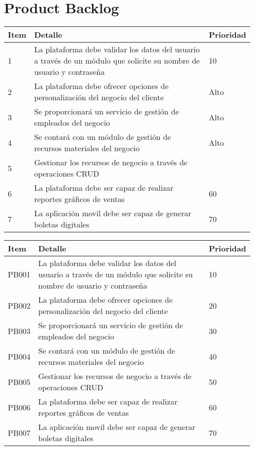 \chapter{Product Backlog}

\begin{table}[htbp]
	\begin{center}
		\begin{tabular}{|p{0.8cm} | p{12cm} | p{2cm} |}
			\hline
			Item & Detalle & Prioridad \\
			\hline
			1 & La plataforma debe validar los datos del usuario a través de un módulo que solicite su nombre de usuario y contraseña & 10 \\
			\hline
			2 & La plataforma debe ofrecer opciones de personalización del negocio del cliente & Alto  \\
			\hline
			3 & Se proporcionará un servicio de gestión de empleados del negocio & Alto  \\
			\hline
			4 & Se contará con un módulo de gestión de recursos materiales del negocio & Alto  \\
			\hline
			5 & Gestionar los recursos de negocio a través de operaciones CRUD &  \\
			\hline	
			6 & La plataforma debe ser capaz de realizar reportes gráficos de ventas & 60 \\
			\hline
			7 & La aplicación movil debe ser capaz de generar boletas digitales & 70 \\
		\end{tabular}
	\end{center}
\end{table}

\begin{table}[htbp]
	\begin{center}
		\begin{tabular}{|p{1.2cm} | p{12cm} | p{2cm} |}
			\hline
			Item & Detalle & Prioridad \\
			\hline
			PB001 & La plataforma debe validar los datos del usuario a través de un módulo que solicite su nombre de usuario y contraseña & 10 \\
			\hline
			PB002 & La plataforma debe ofrecer opciones de personalización del negocio del cliente & 20  \\
			\hline
			PB003 & Se proporcionará un servicio de gestión de empleados del negocio & 30  \\
			\hline
			PB004 & Se contará con un módulo de gestión de recursos materiales del negocio & 40 \\
			\hline
			PB005 & Gestionar los recursos de negocio a través de operaciones CRUD & 50 \\
			\hline	
			PB006 & La plataforma debe ser capaz de realizar reportes gráficos de ventas & 60 \\
			\hline
			PB007 & La aplicación movil debe ser capaz de generar boletas digitales & 70 \\
			\hline
		\end{tabular}
	\end{center}
\end{table}
